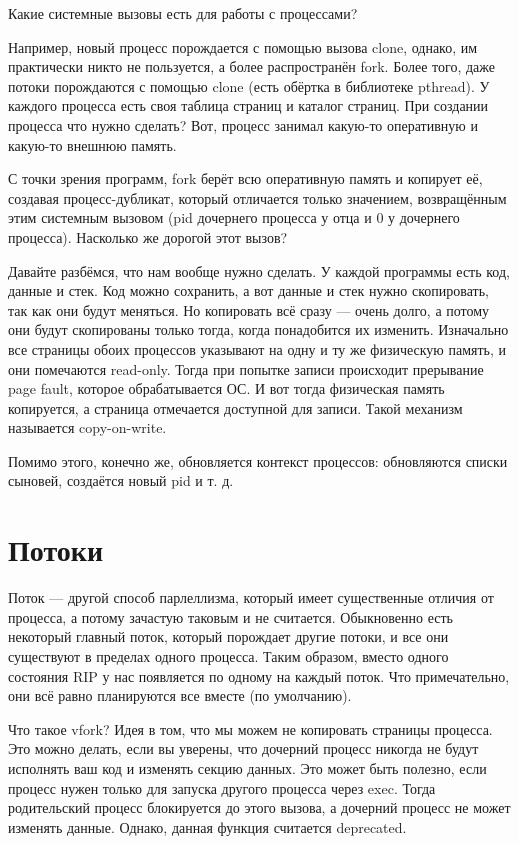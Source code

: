 \documentclass[main]{subfiles}
\begin{document}
Какие системные вызовы есть для работы с процессами?

Например, новый процесс порождается с помощью вызова clone, однако,
им практически никто не пользуется, а более распространён fork.
Более того, даже потоки порождаются с помощью clone (есть обёртка
в библиотеке pthread). У каждого процесса есть своя таблица
страниц и каталог страниц. При создании процесса что нужно сделать?
Вот, процесс занимал какую-то оперативную и какую-то внешнюю память.

С точки зрения программ, fork берёт всю оперативную память и копирует
её, создавая процесс-дубликат, который отличается только значением,
возвращённым этим системным вызовом (pid дочернего процесса у отца
и 0 у дочернего процесса). Насколько же дорогой этот вызов?

Давайте разбёмся, что нам вообще нужно сделать. У каждой программы есть
код, данные и стек. Код можно сохранить, а вот данные и стек нужно
скопировать, так как они будут меняться. Но копировать всё сразу --- очень
долго, а потому они будут скопированы только тогда, когда понадобится их
изменить. Изначально все страницы обоих процессов указывают на одну и ту
же физическую память, и они помечаются read-only. Тогда при попытке записи
происходит прерывание page fault, которое обрабатывается ОС. И вот тогда
физическая память копируется, а страница отмечается доступной для записи.
Такой механизм называется copy-on-write.

Помимо этого, конечно же, обновляется контекст процессов: обновляются списки
сыновей, создаётся новый pid и т. д.

\section{Потоки}
Поток --- другой способ парлеллизма, который имеет существенные отличия от
процесса, а потому зачастую таковым и не считается. Обыкновенно есть  некоторый
главный поток, который порождает другие потоки, и все они существуют в пределах
одного процесса. Таким образом, вместо одного состояния RIP у нас появляется по
одному на каждый поток. Что примечательно, они всё равно планируются все вместе
(по умолчанию).

Что такое vfork? Идея в том, что мы можем не копировать страницы процесса. Это
можно делать, если вы уверены, что дочерний процесс никогда не будут исполнять
ваш код и изменять секцию данных. Это может быть полезно, если процесс нужен
только для запуска другого процесса через exec. Тогда родительский процесс
блокируется до этого вызова, а дочерний процесс не может изменять данные.
Однако, данная функция считается deprecated.
\end{document}
